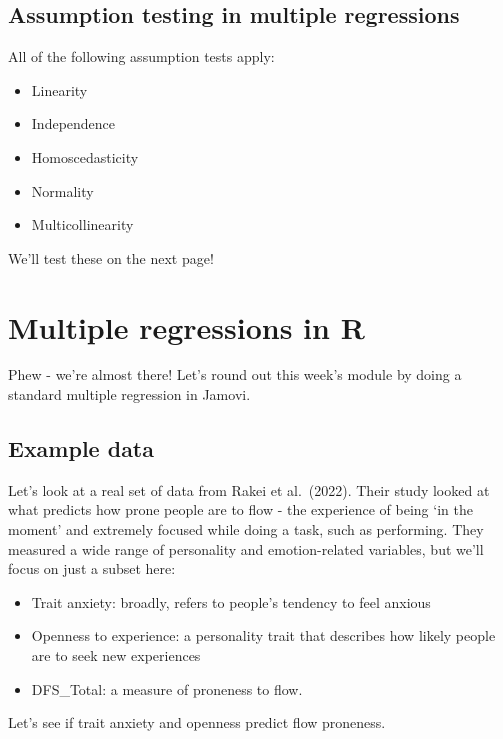 \documentclass[
]{book}
\providecommand{\tightlist}{%
  \setlength{\itemsep}{0pt}\setlength{\parskip}{0pt}}
\begin{document}
\subsection{Assumption testing in multiple regressions}\label{assumption-testing-in-multiple-regressions}

All of the following assumption tests apply:

\begin{itemize}
\tightlist
\item
  Linearity
\item
  Independence
\item
  Homoscedasticity
\item
  Normality
\item
  Multicollinearity
\end{itemize}

We'll test these on the next page!

\section{Multiple regressions in R}\label{multreg-intro}

Phew - we're almost there! Let's round out this week's module by doing a standard multiple regression in Jamovi.

\subsection{Example data}\label{example-data-5}

Let's look at a real set of data from Rakei et al.~(2022). Their study looked at what predicts how prone people are to flow - the experience of being `in the moment' and extremely focused while doing a task, such as performing. They measured a wide range of personality and emotion-related variables, but we'll focus on just a subset here:

\begin{itemize}
\tightlist
\item
  Trait anxiety: broadly, refers to people's tendency to feel anxious
\item
  Openness to experience: a personality trait that describes how likely people are to seek new experiences
\item
  DFS\_Total: a measure of proneness to flow.
\end{itemize}

Let's see if trait anxiety and openness predict flow proneness.
\end{document}
